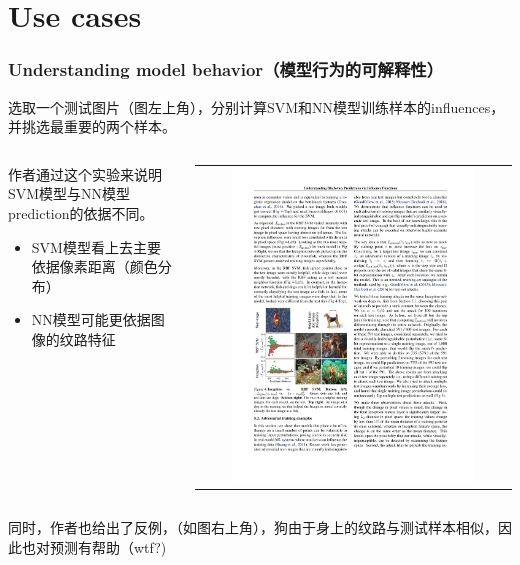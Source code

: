 \documentclass[UTF8]{beamer}
\begin{document}
\section{Use cases}
\begin{frame}
\frametitle{Understanding model behavior（模型行为的可解释性）}
选取一个测试图片（图左上角），分别计算SVM和NN模型训练样本的influences，并挑选最重要的两个样本。
\begin{columns}[T]
\begin{column}{.48\textwidth}
作者通过这个实验来说明SVM模型与NN模型prediction的依据不同。
\begin{itemize}
\item SVM模型看上去主要依据像素距离（颜色分布）
\item NN模型可能更依据图像的纹路特征
\end{itemize}
\end{column}
\hfill%
\begin{column}{.48\textwidth}
\begin{tabular}{c}
\includegraphics[width=0.8\textwidth]{fish.pdf}
\end{tabular} 
\end{column}%
\end{columns}
同时，作者也给出了反例，（如图右上角），狗由于身上的纹路与测试样本相似，因此也对预测有帮助（wtf?)
\end{frame}
\end{document}
